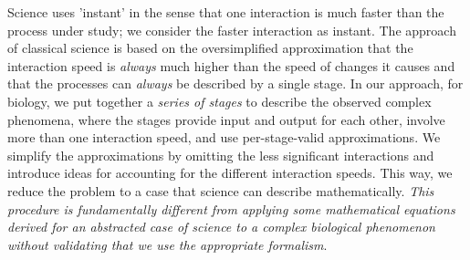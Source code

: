 Science uses 'instant' in the sense that one interaction
is much faster than the process under study; we consider the faster interaction as instant.
The approach of classical science is based on the oversimplified
approximation that the interaction speed is \emph{always} much higher
than the speed of changes it causes and that the processes can \emph{always}
be described by a single stage. In our approach, for biology, we put together a
\textit{series of stages} to describe the observed complex phenomena, where the stages provide input and output
for each other, involve more than one interaction speed, and use per-stage-valid
approximations. We simplify the approximations by omitting the less
significant interactions and introduce ideas for accounting for the different
interaction speeds. This way, we reduce the problem to a case that
science can describe mathematically. \emph{This procedure is fundamentally different
from applying some mathematical equations derived for an abstracted
case of science to a complex biological phenomenon without validating
that we use the appropriate formalism}.




